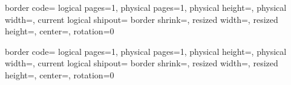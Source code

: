 {%
  \edef\pgfpageoptionheight{\the\paperheight}
  \edef\pgfpageoptionwidth{\the\paperwidth}
  \def\pgfpageoptionborder{0pt}
  \def\pgfpageoptionfirstshipout{1}
  \def\pgfpageoptionbordercode{}
}%
{%
  \pgfpagessetdefaults
  {%
    border code=\pgfpageoptionbordercode
  }
  \pgfpagesphysicalpageoptions
  {%
    logical pages=1,%
    physical pages=1,%
    physical height=\pgfpageoptionheight,%
    physical width=\pgfpageoptionwidth,%
    current logical shipout=\pgfpageoptionfirstshipout%
  }
    {%
      border shrink=\pgfpageoptionborder,%
      resized width=\pgfphysicalwidth,%
      resized height=\pgfphysicalheight,%
      center=\pgfpoint{.5\pgfphysicalwidth}{.5\pgfphysicalheight},%
      rotation=0
    }%
}

{%
  \edef\pgfpageoptionheight{\the\paperheight}
  \edef\pgfpageoptionwidth{\the\paperwidth}
  \def\pgfpageoptionborder{0pt}
  \def\pgfpageoptionfirstshipout{1}
  \def\pgfpageoptionbordercode{}
}%
{%
  \pgfpagessetdefaults
  {%
    border code=\pgfpageoptionbordercode
  }
  \pgfpagesphysicalpageoptions
  {%
    logical pages=1,%
    physical pages=1,%
    physical height=\pgfpageoptionheight,%
    physical width=\pgfpageoptionwidth,%
    current logical shipout=\pgfpageoptionfirstshipout%
  }
    {%
      border shrink=\pgfpageoptionborder,%
      resized width=\pgfphysicalwidth,%
      resized height=\pgfphysicalheight,%
      center=\pgfpoint{.5\pgfphysicalwidth}{.5\pgfphysicalheight},%
      rotation=0
    }%
}

